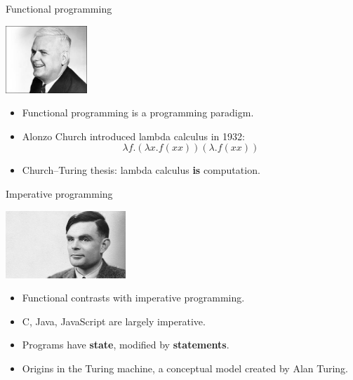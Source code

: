 \begin{frame}{Functional programming}
  \begin{center}
    \includegraphics[height=1in]{img/church.jpg}
  \end{center}
  \begin{itemize}
    \item Functional programming is a programming paradigm.
    \item Alonzo Church introduced lambda calculus in 1932:
      $$ \lambda f . ( \lambda x . f ( x x ) ) ( \lambda . f ( x x ) )$$
    \item Church--Turing thesis: lambda calculus \textbf{is} computation.
  \end{itemize}
\end{frame}

\begin{frame}{Imperative programming}
  \begin{center}
    \includegraphics[height=1in]{img/alanturing.jpg}
  \end{center}
  \begin{itemize}
    \item Functional contrasts with imperative programming.
    \item C, Java, JavaScript are largely imperative.
    \item Programs have \textbf{state}, modified by \textbf{statements}.
    \item Origins in the Turing machine, a conceptual model created by Alan Turing.
  \end{itemize}
\end{frame}